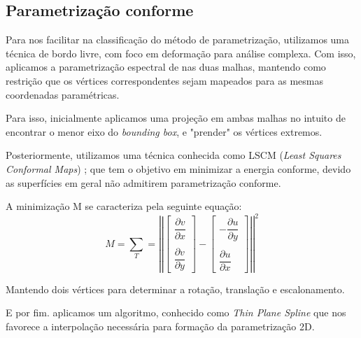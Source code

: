 
\subsection{Parametrização conforme}

Para nos facilitar na classificação do método de parametrização, utilizamos uma técnica de bordo livre, com foco em deformação para análise complexa. Com isso, aplicamos a parametrização espectral de \cite{Mullen} nas duas malhas, mantendo como restrição que os vértices correspondentes sejam mapeados para as mesmas coordenadas paramétricas.

Para isso, inicialmente aplicamos uma projeção em ambas malhas no intuito de encontrar o menor eixo do \textit{bounding box}, e "prender" os vértices extremos.
 
Posteriormente, utilizamos uma técnica conhecida como LSCM (\textit{Least Squares Conformal Maps}) \cite{Levy:2002}; que tem o objetivo em minimizar a energia conforme, devido as superfícies em geral não admitirem parametrização conforme.

A minimização M se caracteriza pela seguinte equação:
\[ M = \sum_{T}= \left|\left| \left[ \begin{array}{c}  \dfrac{\partial v}{\partial x} \\ \\  \dfrac{\partial v}{\partial y}  \end{array} \right] - \left[ \begin{array}{c}  -\dfrac{\partial u}{\partial y}  \\ \\ \dfrac{\partial u}{\partial x}  \end{array} \right] \right| \right|^{2} \]
\vspace*{0.3mm}

Mantendo dois vértices para determinar a rotação, translação e escalonamento.

E por fim. aplicamos um algoritmo, conhecido como \textit{Thin Plane Spline} \cite{Duchon} que nos favorece a interpolação necessária para formação da parametrização 2D.
%


